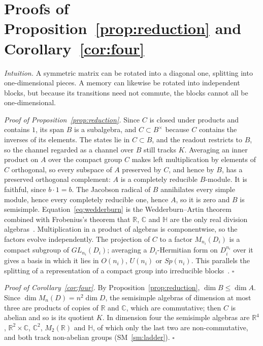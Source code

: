 \documentclass[aps,prx,reprint,superscriptaddress,longbibliography,nofootinbib,floatfix]{revtex4-2}
\newcommand{\HH}{\mathbb{H}}
\newcommand{\CC}{\mathbb{C}}
\newcommand{\RR}{\mathbb{R}}
\theoremstyle{plain}
\theoremstyle{definition}
\begin{document}
\section{Proofs of Proposition~\ref{prop:reduction} and Corollary~\ref{cor:four}}\label{sm:reduction}

\emph{Intuition.} A symmetric matrix can be rotated into a diagonal one,
splitting into one-dimensional pieces. A memory can likewise be rotated into
independent blocks, but because its transitions need not commute, the
blocks cannot all be one-dimensional.

\emph{Proof of Proposition~\ref{prop:reduction}.} Since $C$ is closed under
products and contains $1$, its span $B$ is a subalgebra, and
$C\subset B^\times$ because $C$ contains the inverses of its elements. The
states lie in $C\subset B$, and the readout restricts to $B$, so the
channel regarded as a channel over $B$ still tracks $K$. Averaging an inner
product on $A$ over the compact group $C$ makes left multiplication by
elements of $C$ orthogonal, so every subspace of $A$ preserved by $C$, and
hence by $B$, has a preserved orthogonal complement: $A$ is a completely
reducible $B$-module. It is faithful, since $b\cdot1=b$. The Jacobson
radical of $B$ annihilates every simple module, hence every completely
reducible one, hence $A$, so it is zero and $B$ is semisimple.
Equation~\eqref{eq:wedderburn} is the Wedderburn--Artin theorem combined
with Frobenius's theorem that $\RR$, $\CC$ and $\HH$ are the only real
division algebras~\cite{lam}. Multiplication in a product of algebras is
componentwise, so the factors evolve independently. The projection of $C$
to a factor $M_{n_i}(D_i)$ is a compact subgroup of $GL_{n_i}(D_i)$;
averaging a $D_i$-Hermitian form on $D_i^{n_i}$ over it gives a basis in
which it lies in $O(n_i)$, $U(n_i)$ or $Sp(n_i)$. This parallels the
splitting of a representation of a compact group into irreducible
blocks~\cite{broecker}. $\square$

\emph{Proof of Corollary~\ref{cor:four}.} By
Proposition~\ref{prop:reduction}, $\dim B\le\dim A$. Since $\dim
M_n(D)=n^2\dim D$, the semisimple algebras of dimension at most three are
products of copies of $\RR$ and $\CC$, which are commutative; then $C$ is
abelian and so is its quotient $K$. In dimension four the semisimple
algebras are $\RR^4$, $\RR^2\times\CC$, $\CC^2$, $M_2(\RR)$ and $\HH$, of
which only the last two are non-commutative, and both track non-abelian
groups (SM~\ref{sm:ladder}). $\square$
\end{document}
